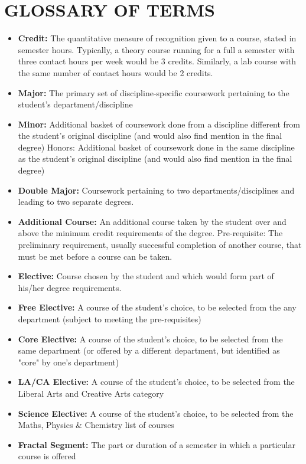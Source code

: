 \section{GLOSSARY OF TERMS }
\begin{itemize}
\item {\bf Credit:} The quantitative measure of recognition given to a course, stated in semester hours. Typically, a theory course running for a full a semester with three contact hours per week would be 3 credits. Similarly, a lab course with the same number of contact hours would be 2 credits.  
\item {\bf Major:} The primary set of discipline-specific coursework pertaining to the student’s department/discipline  
\item {\bf Minor:} Additional basket of coursework done from a discipline different from the student’s original discipline (and would also find mention in the final degree)
Honors: Additional basket of coursework done in the same discipline as the student’s original discipline (and would also find mention in the final degree)
\item {\bf Double Major:} Coursework pertaining to two departments/disciplines and leading to two separate degrees.
\item {\bf Additional Course:} An additional course taken by the student over and above the minimum credit requirements of the degree. 
Pre-requisite: The preliminary requirement, usually successful completion of another course, that must be met before a course can be taken.
\item {\bf Elective:} Course chosen by the student and which would form part of his/her degree requirements. 
\item {\bf Free Elective:} A course of the student’s choice, to be selected from the any department (subject to meeting the pre-requisites) 
\item {\bf Core Elective:} A course of the student’s choice, to be selected from the same department (or offered by a different department, but identified as "core" by one's department)
\item {\bf LA/CA Elective:} A course of the student’s choice, to be selected from the Liberal Arts and Creative Arts category 
\item {\bf Science Elective:} A course of the student’s choice, to be selected from the Maths, Physics \& Chemistry list of courses
\item {\bf Fractal Segment:} The part or duration of a semester in which a particular course is offered
\end{itemize}


